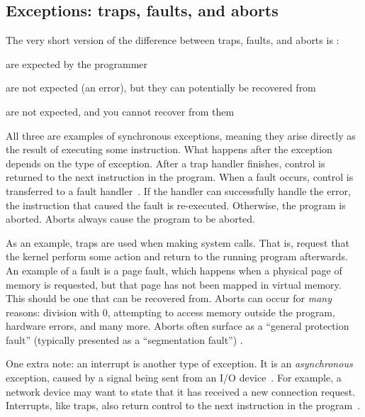 \subsection{Exceptions: traps, faults, and aborts}

The very short version of the difference between traps, faults, and aborts is \cite[p. 762]{computersystems}:

\begin{description}[labelindent=1cm]
  \item[Traps] are expected by the programmer
  \item[Faults] are not expected (an error), but they can potentially be recovered from
  \item[Aborts] are not expected, and you cannot recover from them
\end{description}

All three are examples of synchronous exceptions, meaning they arise directly as the result of executing some instruction. What happens after the exception depends on the type of exception. After a trap handler finishes, control is returned to the next instruction in the program. When a fault occurs, control is transferred to a fault handler~\cite[765]{computersystems}. If the handler can successfully handle the error, the instruction that caused the fault is re-executed. Otherwise, the program is aborted. Aborts always cause the program to be aborted.

As an example, traps are used when making system calls. That is, request that the kernel perform some action and return to the running program afterwards. An example of a fault is a page fault, which happens when a physical page of memory is requested, but that page has not been mapped in virtual memory. This should be one that can be recovered from. Aborts can occur for \textit{many} reasons: division with 0, attempting to access memory outside the program, hardware errors, and many more. Aborts often surface as a ``general protection fault'' (typically presented as a ``segmentation fault'') \cite[p. 765]{computersystems}.

One extra note: an interrupt is another type of exception. It is an \textit{asynchronous} exception, caused by a signal being sent from an I/O device~\cite[p. 762]{computersystems}. For example, a network device may want to state that it has received a new connection request. Interrupts, like traps, also return control to the next instruction in the program~\cite[p. 763]{computersystems}.
